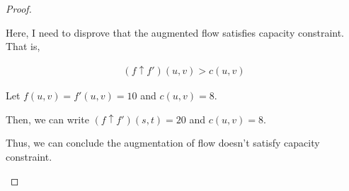 \documentclass[12pt]{article}
\begin{document}
\begin{enumerate}[1.]
\begin{proof}
\begin{itemize}
        \bigskip

        Here, I need to disprove that the augmented flow satisfies capacity constraint. That is,

        \begin{align}
            (f \uparrow f')(u,v) > c(u,v)
        \end{align}

        \bigskip

        Let $f(u,v) = f'(u,v) = 10$ and $c(u,v) = 8$.

        \bigskip

        Then, we can write $(f \uparrow f')(s,t) = 20$ and $c(u,v) = 8$.

        \bigskip

        Thus, we can conclude the augmentation of flow doesn't satisfy capacity constraint.
    \end{itemize}

    \end{proof}













\end{enumerate}
\end{document}

